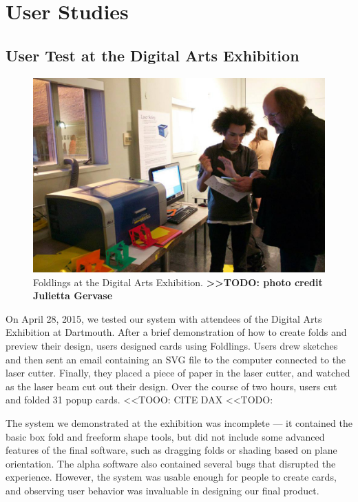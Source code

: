 \chapter{User Studies}

\section{User Test at the Digital Arts
Exhibition}\label{user-test-at-the-digital-arts-exhibition}

\begin{figure}[htbp]
\centering
\includegraphics{figures/50_User_Study_Dax/dax_facebook_credit_Julietta_Gervase}
\caption{Foldlings at the Digital Arts Exhibition.
\textbf{\textgreater{}\textgreater{}TODO: photo credit Julietta
Gervase}}
\end{figure}

On April 28, 2015, we tested our system with attendees of the Digital
Arts Exhibition at Dartmouth. After a brief demonstration of how to
create folds and preview their design, users designed cards using
Foldlings. Users drew sketches and then sent an email containing an SVG
file to the computer connected to the laser cutter. Finally, they placed
a piece of paper in the laser cutter, and watched as the laser beam cut
out their design. Over the course of two hours, users cut and folded 31
popup cards. \textless{}\textless{}TOOO: CITE DAX
\textless{}\textless{}TODO:

The system we demonstrated at the exhibition was incomplete --- it
contained the basic box fold and freeform shape tools, but did not
include some advanced features of the final software, such as dragging
folds or shading based on plane orientation. The alpha software also
contained several bugs that disrupted the experience. However, the
system was usable enough for people to create cards, and observing user
behavior was invaluable in designing our final product.

